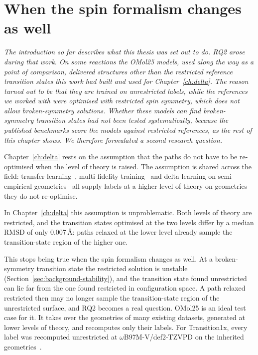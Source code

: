 \section{When the spin formalism changes as well}

\emph{The introduction so far describes what this thesis was set out to do.
RQ2 arose during that work. On some reactions the OMol25 models, used
along the way as a point of comparison, delivered structures other than
the restricted reference transition states this work had built and used
for Chapter~\ref{ch:delta}. The reason turned out to be that they are trained on
unrestricted labels, while the references we worked with were
optimised with restricted spin symmetry, which does not allow
broken-symmetry solutions. Whether these models
can find broken-symmetry transition states had not been tested
systematically, because the published benchmarks score the models
against restricted references, as the rest of this chapter shows. We
therefore formulated a second research question.}


Chapter~\ref{ch:delta} rests on the assumption that the paths do not
have to be re-optimised when the level of theory is raised. The
assumption is shared across the field: transfer
learning~\cite{smith2019ani1ccx}, multi-fidelity
training~\cite{messerly2025} and delta learning on semi-empirical
geometries~\cite{ren2026} all
supply labels at a higher level of theory on geometries they do not
re-optimise.

In Chapter~\ref{ch:delta} this assumption is unproblematic. Both
levels of theory are restricted, and the transition states optimised
at the two levels differ by a median RMSD of only 0.007\,\AA{}: paths
relaxed at the lower level already sample the transition-state region
of the higher one.

This stops being true when the spin formalism changes as well. At a
broken-symmetry transition state the restricted solution is unstable
(Section~\ref{sec:background-stability}), and the transition state found
unrestricted can lie far from the one found restricted in configuration
space. A path relaxed restricted then may no longer sample the
transition-state region of the unrestricted surface, and RQ2 becomes a
real question. OMol25 is an ideal test case for it. It takes over the
geometries of many existing datasets, generated at lower levels of
theory, and recomputes only their labels. For Transition1x, every label
was recomputed unrestricted at \mbox{$\omega$B97M-V/def2-TZVPD} on the
inherited geometries~\cite{omol25}.


